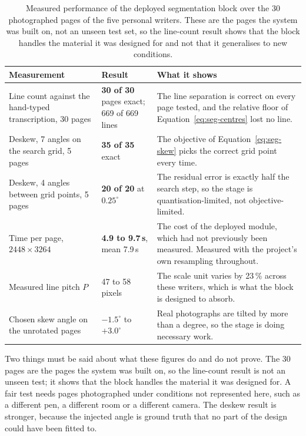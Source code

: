 \begin{table}[h]
\centering
\fontsize{9}{11}\selectfont
\setlength{\tabcolsep}{4pt}
\begin{tabularx}{\linewidth}{|p{4.3cm}|p{3.3cm}|X|}
\hline
\textbf{Measurement} & \textbf{Result} & \textbf{What it shows} \\
\hline
Line count against the hand-typed transcription, 30 pages & \textbf{30 of 30} pages exact; 669 of 669 lines & The line separation is correct on every page tested, and the relative floor of Equation~\ref{eq:seg-centres} lost no line. \\
\hline
Deskew, 7 angles on the search grid, 5 pages & \textbf{35 of 35} exact & The objective of Equation~\ref{eq:seg-skew} picks the correct grid point every time. \\
\hline
Deskew, 4 angles between grid points, 5 pages & \textbf{20 of 20} at $0.25^\circ$ & The residual error is exactly half the search step, so the stage is quantisation-limited, not objective-limited. \\
\hline
Time per page, $2448\times3264$ & \textbf{4.9 to 9.7\,s}, mean 7.9\,s & The cost of the deployed module, which had not previously been measured. Measured with the project's own resampling throughout. \\
\hline
Measured line pitch $P$ & 47 to 58 pixels & The scale unit varies by 23\,\% across these writers, which is what the block is designed to absorb. \\
\hline
Chosen skew angle on the unrotated pages & $-1.5^\circ$ to $+3.0^\circ$ & Real photographs are tilted by more than a degree, so the stage is doing necessary work. \\
\hline
\end{tabularx}
\caption{Measured performance of the deployed segmentation block over the 30 photographed pages of the five personal writers. These are the pages the system was built on, not an unseen test set, so the line-count result shows that the block handles the material it was designed for and not that it generalises to new conditions.}
\label{tab:seg-test}
\end{table}

Two things must be said about what these figures do and do not prove. The 30 pages are the pages the system was built on, so the line-count result is not an unseen test; it shows that the block handles the material it was designed for. A fair test needs pages photographed under conditions not represented here, such as a different pen, a different room or a different camera. The deskew result is stronger, because the injected angle is ground truth that no part of the design could have been fitted to.

